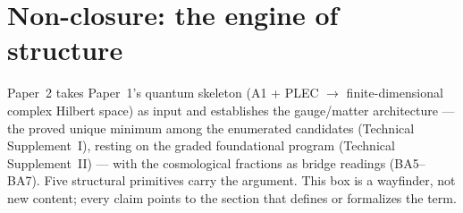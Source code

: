 \documentclass[11pt]{article}
\begin{document}
\section{Non-closure: the engine of structure}
\label{sec:nonclosure}

\begin{tcolorbox}[apfbox, title={Operational primitives: where each structural term is defined and used}]
Paper~2 takes Paper~1's quantum skeleton (A1 + PLEC $\rightarrow$ finite-dimensional complex Hilbert space) as input and establishes the gauge/matter architecture --- the proved unique minimum among the enumerated candidates (Technical Supplement~I), resting on the graded foundational program (Technical Supplement~II) --- with the cosmological fractions as bridge readings (BA5--BA7).  Five structural primitives carry the argument.  This box is a wayfinder, not new content; every claim points to the section that defines or formalizes the term.


\end{tcolorbox}
\end{document}
